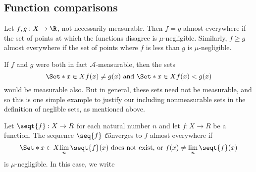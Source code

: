 \subsection*{Function comparisons}

Let $f, g: X \to \R $, not necessarily measurable.
Then $f = g$ almost everywhere if the set of points at which the functions disagree is
$\mu $-negligible.
Similarly, $f \geq g$ almost everywhere if the set of points where $f$ is less than $g$ is $\mu $-negligible.

If $f$ and $g$ were both in fact $\mathcal{A} $-measurable, then the sets
    \[
\Set*{x \in X}{f(x) \neq g(x)}
\text{ and }
\Set*{x \in X}{f(x) < g(x)}
    \]
would be measurable also.
But in general, these sets need not be measurable, and so this is one simple example to justify our including nonmeasurable sets in the definition of neglible sets, as mentioned above.

Let $\seqt{f}: X \to R$ for each natural number $n$ and let $f: X \to R$ be a function.
The sequence $\seq{f}$ \t{converges to $f$ almost everywhere} if
    \[
\Set*{x \in X}{\lim_{n} \seqt{f}(x) \text{ does not exist, or } f(x) \neq \lim_{n} \seqt{f}(x)}
    \]
is $\mu $-negligible.
In this case, we write 
